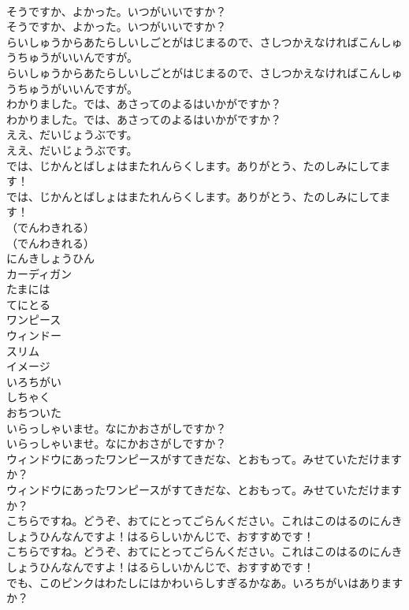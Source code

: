 \documentclass[8pt]{extreport}
\begin{document}
\begin{CJK}{UTF8}{min}
\\	そうですか、よかった。いつがいいですか？	
\\	そうですか、よかった。いつがいいですか？ 
\\	らいしゅうからあたらしいしごとがはじまるので、さしつかえなければこんしゅうちゅうがいいんですが。	
\\	らいしゅうからあたらしいしごとがはじまるので、さしつかえなければこんしゅうちゅうがいいんですが。 
\\	わかりました。では、あさってのよるはいかがですか？	
\\	わかりました。では、あさってのよるはいかがですか？ 
\\	ええ、だいじょうぶです。	
\\	ええ、だいじょうぶです。 
\\	では、じかんとばしょはまたれんらくします。ありがとう、たのしみにしてます！	
\\	では、じかんとばしょはまたれんらくします。ありがとう、たのしみにしてます！ 
\\	（でんわきれる）	
\\	（でんわきれる） 
\\	にんきしょうひん
\\	カーディガン
\\	たまには
\\	てにとる
\\	ワンピース
\\	ウィンドー
\\	スリム
\\	イメージ
\\	いろちがい
\\	しちゃく
\\	おちついた
\\	いらっしゃいませ。なにかおさがしですか？	
\\	いらっしゃいませ。なにかおさがしですか？ 
\\	ウィンドウにあったワンピースがすてきだな、とおもって。みせていただけますか？	
\\	ウィンドウにあったワンピースがすてきだな、とおもって。みせていただけますか？ 
\\	こちらですね。どうぞ、おてにとってごらんください。これはこのはるのにんきしょうひんなんですよ！はるらしいかんじで、おすすめです！	
\\	こちらですね。どうぞ、おてにとってごらんください。これはこのはるのにんきしょうひんなんですよ！はるらしいかんじで、おすすめです！ 
\\	でも、このピンクはわたしにはかわいらしすぎるかなあ。いろちがいはありますか？	

\end{CJK}
\end{document}
